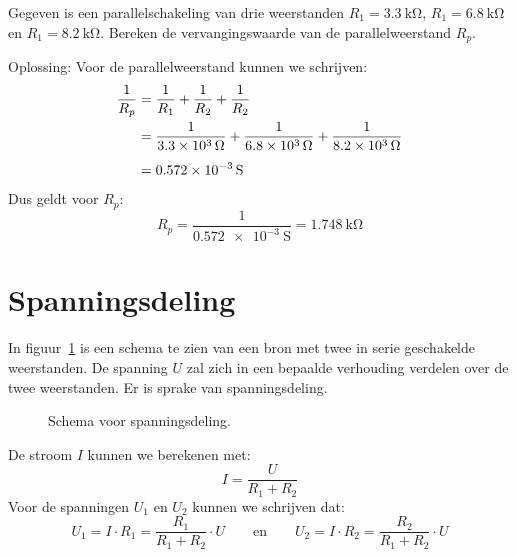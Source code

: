 \begin{example}
Gegeven is een parallelschakeling van drie weerstanden $R_1 = \SI{3.3}{\kilo\ohm}$,
$R_1 = \SI{6.8}{\kilo\ohm}$ en $R_1 = \SI{8.2}{\kilo\ohm}$. Bereken de vervangingswaarde
van de parallelweerstand $R_p$.

Oplossing: Voor de parallelweerstand kunnen we schrijven:
\begin{equation}
\begin{split}
\dfrac{1}{R_p} &= \dfrac{1}{R_1} + \dfrac{1}{R_2} + \dfrac{1}{R_2} \\
               &= \dfrac{1}{\SI{3.3d3}{\ohm}} + \dfrac{1}{\SI{6.8d3}{\ohm}} + \dfrac{1}{\SI{8.2d3}{\ohm}} \\[1ex]
               &= \SI{0,572e-3}{\siemens}
\end{split}
\end{equation}
%
Dus geldt voor $R_p$:
\begin{equation}
R_p = \dfrac{1}{\SI{0,572e-3}{\siemens}} = \SI{1,748}{\kilo\ohm}
\end{equation}
\end{example}

\section{Spanningsdeling}
In figuur~\ref{fig:gelspanningsdeling} is een schema te zien van een bron met twee in
serie geschakelde weerstanden. De spanning $U$ zal zich in een bepaalde verhouding
verdelen over de twee weerstanden. Er is sprake van spanningsdeling.

\begin{figure}[!ht]
\centering
{}
\caption{Schema voor spanningsdeling.}
\label{fig:gelspanningsdeling}
\end{figure}

De stroom $I$ kunnen we berekenen met:
%
\begin{equation}
I = \dfrac{U}{R_1+R_2}
\end{equation} 
%
Voor de spanningen $U_1$ en $U_2$ kunnen we schrijven dat:
%
\begin{equation}
U_1 = I\cdot R_1 = \dfrac{R_1}{R_1+R_2}\cdot U \qquad\text{en}\qquad U_2 = I\cdot R_2 = \dfrac{R_2}{R_1+R_2}\cdot U
\end{equation}


